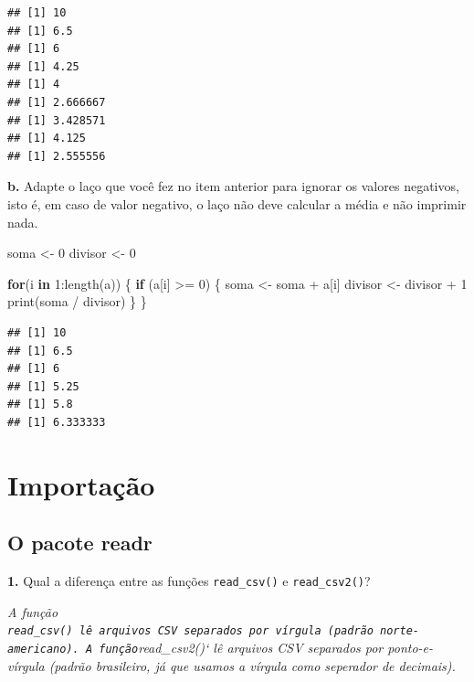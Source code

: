 \documentclass[
]{book}
\newenvironment{Shaded}{\begin{snugshade}}{\end{snugshade}}
\newcommand{\ControlFlowTok}[1]{\textcolor[rgb]{0.13,0.29,0.53}{\textbf{#1}}}
\newcommand{\DecValTok}[1]{\textcolor[rgb]{0.00,0.00,0.81}{#1}}
\newcommand{\FunctionTok}[1]{\textcolor[rgb]{0.00,0.00,0.00}{#1}}
\newcommand{\NormalTok}[1]{#1}
\newcommand{\OtherTok}[1]{\textcolor[rgb]{0.56,0.35,0.01}{#1}}
\newcommand{\SpecialCharTok}[1]{\textcolor[rgb]{0.00,0.00,0.00}{#1}}
\begin{document}
\begin{verbatim}
## [1] 10
## [1] 6.5
## [1] 6
## [1] 4.25
## [1] 4
## [1] 2.666667
## [1] 3.428571
## [1] 4.125
## [1] 2.555556
\end{verbatim}

\textbf{b.} Adapte o laço que você fez no item anterior para ignorar os valores negativos, isto é, em caso de valor negativo, o laço não deve calcular a média e não imprimir nada.

\begin{Shaded}
\begin{Highlighting}[]
\NormalTok{soma }\OtherTok{\textless{}{-}} \DecValTok{0}
\NormalTok{divisor }\OtherTok{\textless{}{-}} \DecValTok{0}

\ControlFlowTok{for}\NormalTok{(i }\ControlFlowTok{in} \DecValTok{1}\SpecialCharTok{:}\FunctionTok{length}\NormalTok{(a)) \{}
  \ControlFlowTok{if}\NormalTok{ (a[i] }\SpecialCharTok{\textgreater{}=} \DecValTok{0}\NormalTok{) \{}
\NormalTok{    soma }\OtherTok{\textless{}{-}}\NormalTok{ soma }\SpecialCharTok{+}\NormalTok{ a[i]}
\NormalTok{    divisor }\OtherTok{\textless{}{-}}\NormalTok{ divisor }\SpecialCharTok{+} \DecValTok{1}
    \FunctionTok{print}\NormalTok{(soma }\SpecialCharTok{/}\NormalTok{ divisor)}
\NormalTok{  \}}
\NormalTok{\}}
\end{Highlighting}
\end{Shaded}

\begin{verbatim}
## [1] 10
## [1] 6.5
## [1] 6
## [1] 5.25
## [1] 5.8
## [1] 6.333333
\end{verbatim}

\hypertarget{importauxe7uxe3o}{%
\section{Importação}\label{importauxe7uxe3o}}

\hypertarget{o-pacote-readr}{%
\subsection*{O pacote readr}\label{o-pacote-readr}}

\textbf{1.} Qual a diferença entre as funções \texttt{read\_csv()} e \texttt{read\_csv2()}?

\emph{A função \texttt{read\_csv()\ lê\ arquivos\ CSV\ separados\ por\ vírgula\ (padrão\ norte-americano).\ A\ função}read\_csv2()` lê arquivos CSV separados por ponto-e-vírgula (padrão brasileiro, já que usamos a vírgula como seperador de decimais).}
\end{document}

